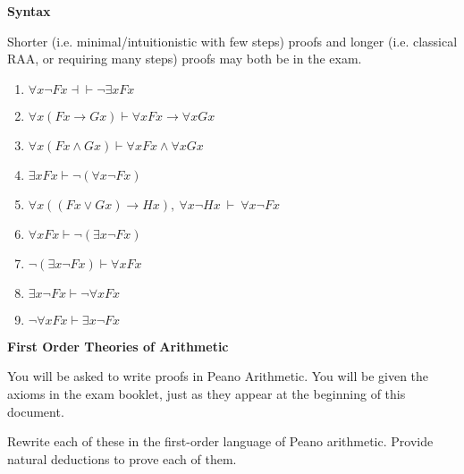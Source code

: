 \documentclass[11pt]{report}
\begin{document}
{\bf Syntax}

Shorter (i.e. minimal/intuitionistic with few steps) proofs and longer (i.e. classical RAA, or requiring many steps) proofs may both be in the exam. 

\begin{enumerate}
	
	\item $\forall x \lnot Fx \dashv\vdash \lnot \exists x Fx$

	\item $\forall x (Fx \rightarrow Gx) \vdash \forall x Fx \rightarrow \forall x Gx$

	\item $\forall x (Fx \land Gx) \vdash \forall x Fx \land \forall x Gx$

	\item $\exists x Fx \vdash \lnot (\forall x \lnot Fx)$
	
	\item $\forall x ((Fx \lor Gx)\rightarrow Hx), \ \forall x \lnot Hx \ \vdash \ \forall x \lnot F x$
	
	\item $\forall x Fx \vdash \lnot (\exists x \lnot Fx)$
	
	\item $\lnot (\exists x \lnot Fx) \vdash \forall x Fx$
	
	\item $\exists x \lnot Fx \vdash \lnot \forall x Fx$

	\item $\lnot \forall x Fx \vdash \exists x \lnot Fx$
	 
\end{enumerate}

\newpage
{\bf First Order Theories of Arithmetic}

You will be asked to write proofs in Peano Arithmetic. You will be given the axioms in the exam booklet, just as they appear at the beginning of this document.

\vspace{0.5cm}

Rewrite each of these in the first-order language of Peano arithmetic. Provide natural deductions to prove each of them.
\end{document}
